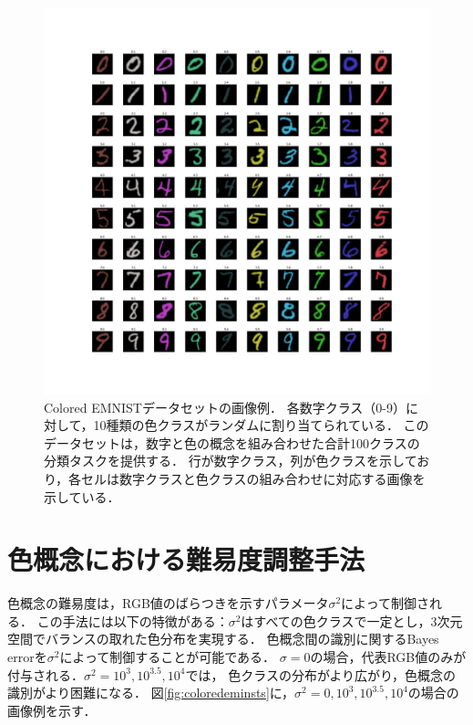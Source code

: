 \begin{figure}[H]
    \centering
    \includegraphics[width=1\columnwidth]{fig/coloredemnist_0.pdf}
    \caption[Colored EMNISTデータセットの画像例．]{
        Colored EMNISTデータセットの画像例．
        各数字クラス（0-9）に対して，10種類の色クラスがランダムに割り当てられている．
        このデータセットは，数字と色の概念を組み合わせた合計100クラスの分類タスクを提供する．
        行が数字クラス，列が色クラスを示しており，各セルは数字クラスと色クラスの組み合わせに対応する画像を示している．
    }
    \label{fig:ColoredEMNIST}
\end{figure}

\newpage

\section{色概念における難易度調整手法}
色概念の難易度は，RGB値のばらつきを示すパラメータ$\sigma^2$によって制御される．
この手法には以下の特徴がある：$\sigma^2$はすべての色クラスで一定とし，3次元空間でバランスの取れた色分布を実現する．
色概念間の識別に関するBayes errorを$\sigma^2$によって制御することが可能である．
$\sigma = 0$の場合，代表RGB値のみが付与される．$\sigma^2 = 10^3, 10^{3.5}, 10^4$では，
色クラスの分布がより広がり，色概念の識別がより困難になる．
図\ref{fig:coloredeminsts}に，$\sigma^2 = 0, 10^3, 10^{3.5}, 10^4$の場合の画像例を示す．

